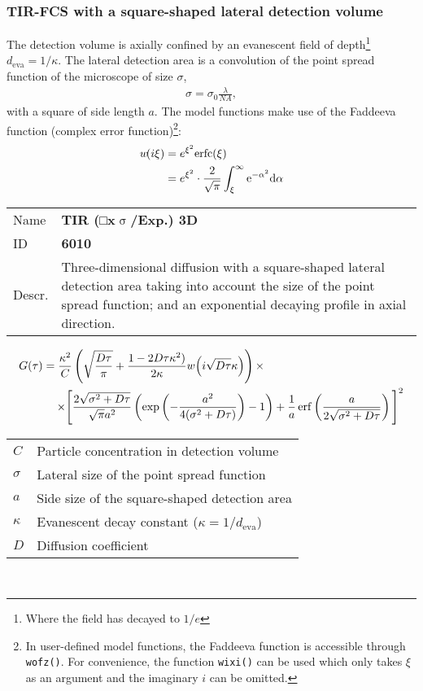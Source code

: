 \subsubsection{TIR-FCS with a square-shaped lateral detection volume}
The detection volume is axially confined by an evanescent field of depth\footnote{Where the field has decayed to $1/e$} $d_\mathrm{eva} = 1 / \kappa$.
The lateral detection area is a convolution of the point spread function of the microscope of size $\sigma$,
\begin{align}
\sigma = \sigma_0  \frac{\lambda}{\mathit{NA}},
\end{align} 
with a square of side length $a$.
The model functions make use of the Faddeeva function (complex error function)\footnote{In user-defined model functions, the Faddeeva function is accessible through \texttt{wofz()}. For convenience, the function \texttt{wixi()} can be used which only takes $\xi$ as an argument and the imaginary $i$ can be omitted.}:
\begin{align}
w\!(i\xi) &= e^{\xi^2} \mathrm{erfc}(\xi) \\
\notag &= e^{\xi^2} \cdot  \frac{2}{\sqrt{\pi}} \int_\xi^\infty \mathrm{e}^{-\alpha^2} \mathrm{d\alpha} \label{eq:faddeeva}
\end{align} 
\vspace{2em}



\noindent \begin{tabular}{lp{}}
Name & \textbf{TIR (□x$\upsigma$/Exp.) 3D} \\ 
ID & \textbf{6010} \\ 
Descr. &  Three-dimensional diffusion with a square-shaped lateral detection area taking into account the size of the point spread function; and an exponential decaying profile in axial direction\cite{Ries2008390, Yordanov2011}. \\ 
\end{tabular}
\begin{align}
G(\tau) =  \frac{\kappa^2}{C} &
\left( \sqrt{\frac{D \tau}{\pi}} + \frac{1 - 2 D \tau \kappa^2)}{2 \kappa} w\!\left(i \sqrt{D \tau} \kappa\right) \right) \times \\
\notag  \times \Bigg[ & \frac{2 \sqrt{\sigma^2+D \tau}}{\sqrt{\pi} a^2}
\left( \exp\left(-\frac{a^2}{4(\sigma^2+D \tau)}\right) - 1 \right) +
\frac{1}{a} \, \mathrm{erf}\left(\frac{a}{2 \sqrt{\sigma^2+D \tau}}\right) \Bigg]^2
\end{align} 
\begin{center}
\begin{tabular}{ll}
$C$ & Particle concentration in detection volume \\ 
$\sigma$ & Lateral size of the point spread function \\ 
$a$ & Side size of the square-shaped detection area \\
$\kappa$ &  Evanescent decay constant ($\kappa = 1/d_\mathrm{eva}$)\\ 
$D$ & Diffusion coefficient \\
\end{tabular} \\
\end{center}
\vspace{2em}


